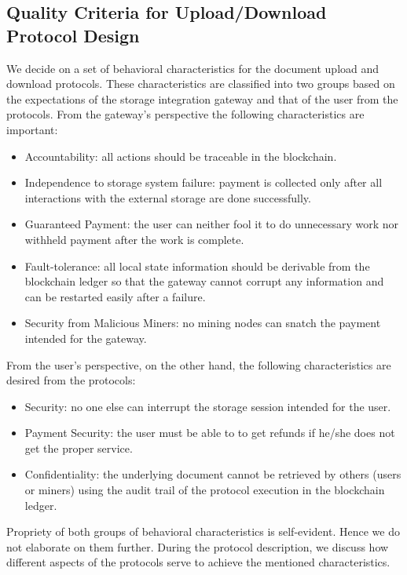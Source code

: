 \subsection{Quality Criteria for Upload/Download Protocol Design}
We decide on a set of behavioral characteristics for the document upload and download protocols. These characteristics are classified into two groups based on the expectations of the storage integration gateway and that of the user from the protocols. 
From the gateway's perspective the following characteristics are important:
\begin{itemize}
\item Accountability: all actions should be traceable in the blockchain.
\item Independence to storage system failure: payment is collected only after all interactions with the external storage are done successfully.
\item Guaranteed Payment: the user can neither fool it to do unnecessary work nor withheld payment after the work is complete.
\item Fault-tolerance: all local state information should be derivable from the blockchain ledger so that the gateway cannot corrupt any information and can be restarted easily after a failure.  
\item Security from Malicious Miners: no mining nodes can snatch the payment intended for the gateway. 
\end{itemize}   
From the user's perspective, on the other hand, the following characteristics are desired from the protocols:
\begin{itemize}
\item Security: no one else can interrupt the storage session intended for the user. 
\item Payment Security: the user must be able to to get refunds if he/she does not get the proper service. 
\item Confidentiality: the underlying document cannot be retrieved by others (users or miners) using the audit trail of the protocol execution in the blockchain ledger.
\end{itemize} 
Propriety of both groups of behavioral characteristics is self-evident. Hence we do not elaborate on them further. During the protocol description, we discuss how different aspects of the protocols serve to achieve the mentioned characteristics. 

